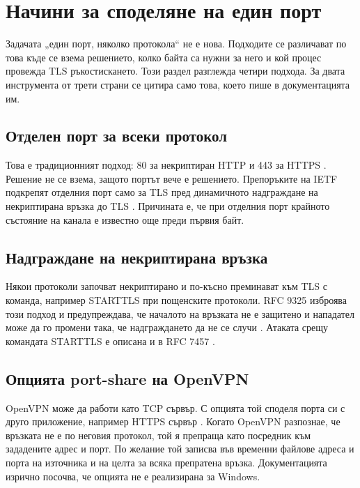 \section{Начини за споделяне на един порт}
\label{sec:sharing}

Задачата „един порт, няколко протокола“ не е нова. Подходите се различават по това къде
се взема решението, колко байта са нужни за него и кой процес провежда TLS
ръкостискането. Този раздел разглежда четири подхода. За двата инструмента от трети
страни се цитира само това, което пише в документацията им.

\subsection{Отделен порт за всеки протокол}

Това е традиционният подход: 80 за некриптиран HTTP и 443 за HTTPS \cite{rfc9110}.
Решение не се взема, защото портът вече е решението. Препоръките на IETF подкрепят
отделния порт само за TLS пред динамичното надграждане на некриптирана връзка до TLS
\cite[раздел 3.2]{rfc9325}. Причината е, че при отделния порт крайното състояние на
канала е известно още преди първия байт.

\subsection{Надграждане на некриптирана връзка}

Някои протоколи започват некриптирано и по-късно преминават към TLS с команда, например
STARTTLS при пощенските протоколи. RFC 9325 изброява този подход и предупреждава, че
началото на връзката не е защитено и нападател може да го промени така, че
надграждането да не се случи \cite[раздел 3.2]{rfc9325}. Атаката срещу командата
STARTTLS е описана и в RFC 7457 \cite[раздел 2.2]{rfc7457}.

\subsection{Опцията port-share на OpenVPN}

OpenVPN може да работи като TCP сървър. С опцията  той споделя порта
си с друго приложение, например HTTPS сървър \cite{openvpn26}. Когато OpenVPN разпознае,
че връзката не е по неговия протокол, той я препраща като посредник към зададените адрес
и порт. По желание той записва във временни файлове адреса и порта на източника и на
целта за всяка препратена връзка. Документацията изрично посочва, че опцията не е
реализирана за Windows.

